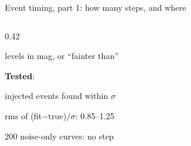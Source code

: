 \begin{frame}{Event timing, part 1: how many steps, and where}
\begin{columns}[T]
\begin{column}{0.42\textwidth}
\begin{tightlist}
      \item levels in mag, or ``fainter than''
    \end{tightlist}
    \vspace{0.4ex}
    \textbf{Tested}:
    \begin{tightlist}
      \item injected events found within $\sigma$
      \item rms of (fit$-$true)$/\sigma$: 0.85--1.25
      \item 200 noise-only curves: no step
    \end{tightlist}
  \end{column}
  \end{columns}
\end{frame}

